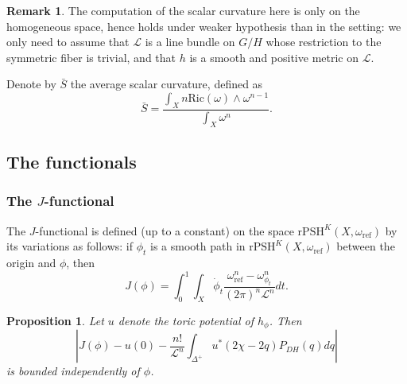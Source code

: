 \documentclass{amsart}
\newtheorem{prop}[thm]{Proposition}
\theoremstyle{definition}
\newtheorem{rem}[thm]{Remark}
\begin{document}
\begin{rem}
The computation of the scalar curvature here is only on the homogeneous space, 
hence holds under weaker hypothesis than in the setting: we only need to assume 
that $\mathcal{L}$ is a line bundle on $G/H$ whose restriction to the symmetric 
fiber is trivial, and that $h$ is a smooth and positive metric on $\mathcal{L}$.
\end{rem}

Denote by $\bar{S}$ the average scalar curvature, defined as 
\[
\bar{S}=\frac{\int_{X} n\mathrm{Ric}(\omega)\wedge \omega^{n-1}}{\int_{X} \omega^{n}}.
\]


\subsection{The functionals}

\subsubsection{The $J$-functional}

The $J$-functional is defined (up to a constant) 
on the space $\mathrm{rPSH}^K(X,\omega_{\mathrm{ref}})$ by its variations as follows:
if $\phi_t$ is a smooth path in 
$\mathrm{rPSH}^K(X,\omega_{\mathrm{ref}})$ 
between the origin and $\phi$, then 
\[
J(\phi)=\int_0^1 \int_{X} 
\dot{\phi}_t \frac{\omega_{\mathrm{ref}}^n-\omega_{\phi_t}^n}{(2\pi)^n\mathcal{L}^n} dt.
\]

\begin{prop}
\label{prop_J_functional}
Let $u$ denote the toric potential of $h_{\phi}$. Then
\[
\left|J(\phi)-u(0)-\frac{n!}{\mathcal{L}^n}\int_{\Delta^+}
u^*(2\chi-2q)P_{DH}(q)dq\right| 
\]
is bounded independently of $\phi$.
\end{prop}
\end{document}
